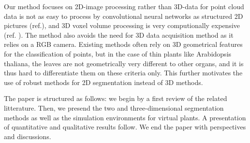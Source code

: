 Our method focuses on 2D-image processing rather than 3D-data for point cloud data is not as
easy to process by convolutional neural networks as structured 2D pictures
(ref.), and 3D voxel volume processing is very computionally expensive (ref. ).
The method also avoids the need for 3D data acquisition method as it relies on a RGB camera.
Existing methods often rely on 3D geometrical features for the classification of points, but in the
case of thin plants like Arabidopsis thaliana, the leaves are not
geometrically very different to other organs, and it is thus hard to differentiate them on these
criteria only. This further motivates the use of robust methods for 2D
segmentation instead of 3D methods.

The paper is structured as follows: we begin by a first review of the related
litterature. Then, we presend the two and three-dimensional segmentation methods
as well as the simulation environments for virtual plants. A presentation of
quantitative and qualitative results follow. We end the paper with perspectives
and discussions.
